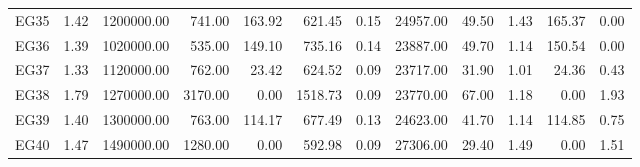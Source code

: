 \begin{tabular}{lrrrrrrrrrrr}
EG35 & 1.42 & 1200000.00 & 741.00 & 163.92 & 621.45 & 0.15 & 24957.00 & 49.50 & 1.43 & 165.37 & 0.00 \\
EG36 & 1.39 & 1020000.00 & 535.00 & 149.10 & 735.16 & 0.14 & 23887.00 & 49.70 & 1.14 & 150.54 & 0.00 \\
EG37 & 1.33 & 1120000.00 & 762.00 & 23.42 & 624.52 & 0.09 & 23717.00 & 31.90 & 1.01 & 24.36 & 0.43 \\
EG38 & 1.79 & 1270000.00 & 3170.00 & 0.00 & 1518.73 & 0.09 & 23770.00 & 67.00 & 1.18 & 0.00 & 1.93 \\
EG39 & 1.40 & 1300000.00 & 763.00 & 114.17 & 677.49 & 0.13 & 24623.00 & 41.70 & 1.14 & 114.85 & 0.75 \\
EG40 & 1.47 & 1490000.00 & 1280.00 & 0.00 & 592.98 & 0.09 & 27306.00 & 29.40 & 1.49 & 0.00 & 1.51 \\
\bottomrule
\end{tabular}

